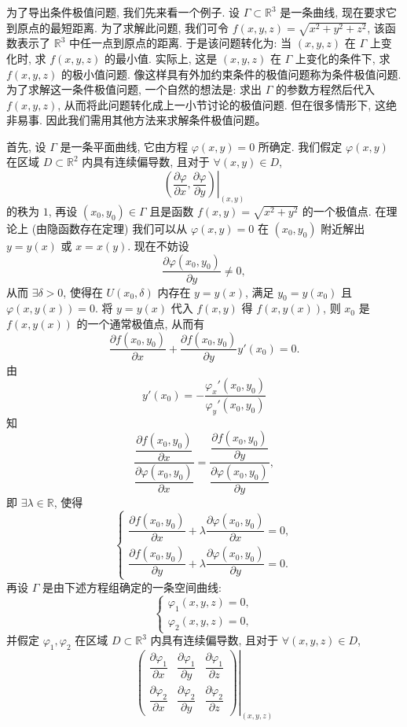 \documentclass[UTF8,12pt,a4paper,fontset=fandol]{ctexart}
\begin{document}
为了导出条件极值问题, 我们先来看一个例子. 设 $\Gamma\subset\mathbb R^3$ 是一条曲线, 现在要求它到原点的最短距离. 为了求解此问题, 我们可令 $f(x,y,z)=\sqrt{x^2+y^2+z^2}$, 该函数表示了 $\mathbb R^3$ 中任一点到原点的距离. 于是该问题转化为: 当 $(x,y,z)$ 在 $\Gamma$ 上变化时, 求 $f(x,y,z)$ 的最小值. 实际上, 这是 $(x,y,z)$ 在 $\Gamma$ 上变化的条件下, 求 $f(x,y,z)$ 的极小值问题. 像这样具有外加约束条件的极值问题称为条件极值问题. 为了求解这一条件极值问题, 一个自然的想法是: 求出 $\Gamma$ 的参数方程然后代入 $f(x,y,z)$, 从而将此问题转化成上一小节讨论的极值问题. 但在很多情形下, 这绝非易事. 因此我们需用其他方法来求解条件极值问题。

首先, 设 $\Gamma$ 是一条平面曲线, 它由方程 $\varphi(x,y)=0$ 所确定. 我们假定 $\varphi(x,y)$ 在区域 $D\subset\mathbb R^2$ 内具有连续偏导数, 且对于 $\forall(x,y)\in D$,
\[
  \left.
  \left(\frac{\partial\varphi}{\partial x},\frac{\partial\varphi}{\partial y}\right)
  \right|_{(x,y)}
\]
的秩为 $1$, 再设 $(x_0,y_0)\in\Gamma$ 且是函数 $f(x,y)=\sqrt{x^2+y^2}$ 的一个极值点. 在理论上 (由隐函数存在定理) 我们可以从 $\varphi(x,y)=0$ 在 $(x_0,y_0)$ 附近解出 $y=y(x)$ 或 $x=x(y)$. 现在不妨设
\[
  \frac{\partial\varphi(x_0,y_0)}{\partial y}\ne0,
\]
从而 $\exists\delta>0$, 使得在 $U(x_0,\delta)$ 内存在 $y=y(x)$, 满足 $y_0=y(x_0)$ 且 $\varphi(x,y(x))=0$. 将 $y=y(x)$ 代入 $f(x,y)$ 得 $f(x,y(x))$, 则 $x_0$ 是 $f(x,y(x))$ 的一个通常极值点, 从而有
\[
  \frac{\partial f(x_0,y_0)}{\partial x}
  +
  \frac{\partial f(x_0,y_0)}{\partial y}y'(x_0)=0.
\]
由
\[
  y'(x_0)=-\frac{\varphi_x'(x_0,y_0)}{\varphi_y'(x_0,y_0)}
\]
知
\[
  \frac{\dfrac{\partial f(x_0,y_0)}{\partial x}}
       {\dfrac{\partial\varphi(x_0,y_0)}{\partial x}}
  =
  \frac{\dfrac{\partial f(x_0,y_0)}{\partial y}}
       {\dfrac{\partial\varphi(x_0,y_0)}{\partial y}},
\]
即 $\exists\lambda\in\mathbb R$, 使得
\[
  \begin{cases}
    \dfrac{\partial f(x_0,y_0)}{\partial x}
    +\lambda\dfrac{\partial\varphi(x_0,y_0)}{\partial x}=0,\\[1.2ex]
    \dfrac{\partial f(x_0,y_0)}{\partial y}
    +\lambda\dfrac{\partial\varphi(x_0,y_0)}{\partial y}=0.
  \end{cases}
\]
再设 $\Gamma$ 是由下述方程组确定的一条空间曲线:
\[
  \begin{cases}
    \varphi_1(x,y,z)=0,\\
    \varphi_2(x,y,z)=0,
  \end{cases}
\]
并假定 $\varphi_1,\varphi_2$ 在区域 $D\subset\mathbb R^3$ 内具有连续偏导数, 且对于 $\forall(x,y,z)\in D$,
\[
  \left.
  \begin{pmatrix}
    \dfrac{\partial\varphi_1}{\partial x} &
    \dfrac{\partial\varphi_1}{\partial y} &
    \dfrac{\partial\varphi_1}{\partial z}\\
    \dfrac{\partial\varphi_2}{\partial x} &
    \dfrac{\partial\varphi_2}{\partial y} &
    \dfrac{\partial\varphi_2}{\partial z}
  \end{pmatrix}
  \right|_{(x,y,z)}
\]
\end{document}
